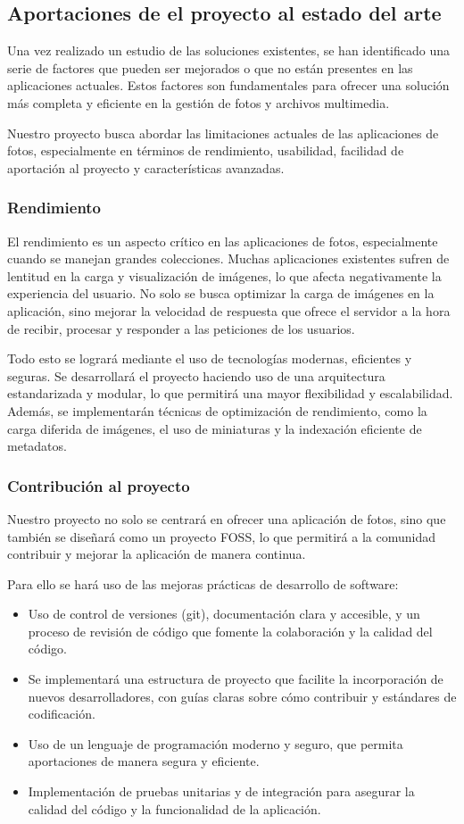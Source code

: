 \subsection{Aportaciones de el proyecto al estado del arte}
Una vez realizado un estudio de las soluciones existentes, se han identificado una serie de factores que pueden ser mejorados o que no están presentes en las aplicaciones actuales. Estos factores son fundamentales para ofrecer una solución más completa y eficiente en la gestión de fotos y archivos multimedia.

Nuestro proyecto busca abordar las limitaciones actuales de las aplicaciones de fotos, especialmente en términos de rendimiento, usabilidad, facilidad de aportación al proyecto y características avanzadas.
\subsubsection{Rendimiento}
El rendimiento es un aspecto crítico en las aplicaciones de fotos, especialmente cuando se manejan grandes colecciones. Muchas aplicaciones existentes sufren de lentitud en la carga y visualización de imágenes, lo que afecta negativamente la experiencia del usuario.
No solo se busca optimizar la carga de imágenes en la aplicación, sino mejorar la velocidad de respuesta que ofrece el servidor a la hora de recibir, procesar y responder a las peticiones de los usuarios.

Todo esto se logrará mediante el uso de tecnologías modernas, eficientes y seguras.
Se desarrollará el proyecto haciendo uso de una arquitectura estandarizada y modular, lo que permitirá una mayor flexibilidad y escalabilidad. Además, se implementarán técnicas de optimización de rendimiento, como la carga diferida de imágenes, el uso de miniaturas y la indexación eficiente de metadatos.
\subsubsection{Contribución al proyecto}
Nuestro proyecto no solo se centrará en ofrecer una aplicación de fotos, sino que también se diseñará como un proyecto FOSS, lo que permitirá a la comunidad contribuir y mejorar la aplicación de manera continua.

Para ello se hará uso de las mejoras prácticas de desarrollo de software:
\begin{itemize}
    \item Uso de control de versiones (\Gls{git}), documentación clara y accesible, y un proceso de revisión de código que fomente la colaboración y la calidad del código.
    \item Se implementará una estructura de proyecto que facilite la incorporación de nuevos desarrolladores, con guías claras sobre cómo contribuir y estándares de codificación.
    \item Uso de un lenguaje de programación moderno y seguro, que permita aportaciones de manera segura y eficiente.
    \item Implementación de pruebas unitarias y de integración para asegurar la calidad del código y la funcionalidad de la aplicación.
\end{itemize}
